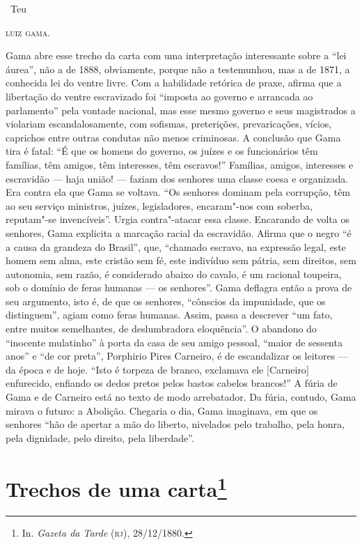 \bigskip

\hfill\ Teu

\hfill\textsc{luiz gama.}

\pagebreak
\mbox{}\vfill
\thispagestyle{empty}

{\small\noindent
Gama abre esse trecho da carta com uma interpretação interessante
sobre a ``lei áurea'', não a de 1888, obviamente, porque não a
testemunhou, mas a de 1871, a conhecida lei do ventre livre. Com a
habilidade retórica de praxe, afirma que a libertação do ventre
escravizado foi ``imposta ao governo e arrancada ao parlamento'' pela
vontade nacional, mas esse mesmo governo e seus magistrados a violariam
escandalosamente, com sofismas, preterições, prevaricações, vícios,
caprichos entre outras condutas não menos criminosas. A conclusão que
Gama tira é fatal: ``É que os homens do governo, os juízes e os
funcionários têm famílias, têm amigos, têm interesses, têm escravos!''
Famílias, amigos, interesses e escravidão --- haja união! --- faziam dos
senhores uma classe coesa e organizada. Era contra ela que Gama se
voltava. ``Os senhores dominam pela corrupção, têm ao seu serviço
ministros, juízes, legisladores, encaram"-nos com soberba, reputam"-se
invencíveis''. Urgia contra"-atacar essa classe. Encarando de volta os
senhores, Gama explicita a marcação racial da escravidão. Afirma que o
negro ``é a causa da grandeza do Brasil'', que, ``chamado escravo, na
expressão legal, este homem sem alma, este cristão sem fé, este
indivíduo sem pátria, sem direitos, sem autonomia, sem razão, é
considerado abaixo do cavalo, é um racional toupeira, sob o domínio de
feras humanas --- os senhores''. Gama deflagra então a prova de seu
argumento, isto é, de que os senhores, ``cônscios da impunidade, que os
distinguem'', agiam como feras humanas. Assim, passa a descrever ``um
fato, entre muitos semelhantes, de deslumbradora eloquência''. O abandono
do ``inocente mulatinho'' à porta da casa de seu amigo pessoal, ``maior de
sessenta anos'' e ``de cor preta'', Porphirio Pires Carneiro, é de
escandalizar os leitores --- da época e de hoje. ``Isto é torpeza de
branco, exclamava ele {[}Carneiro{]} enfurecido, enfiando os dedos
pretos pelos bastos cabelos brancos!'' A fúria de Gama e de Carneiro
está no texto de modo arrebatador. Da fúria, contudo, Gama mirava o
futuro: a Abolição. Chegaria o dia, Gama imaginava, em que os senhores
``hão de apertar a mão do liberto, nivelados pelo trabalho, pela honra,
pela dignidade, pelo direito, pela liberdade''. }

\chapter{Trechos de uma carta\footnote[*]{In. \emph{Gazeta da Tarde}
  (\textsc{rj}), 28/12/1880.}}


